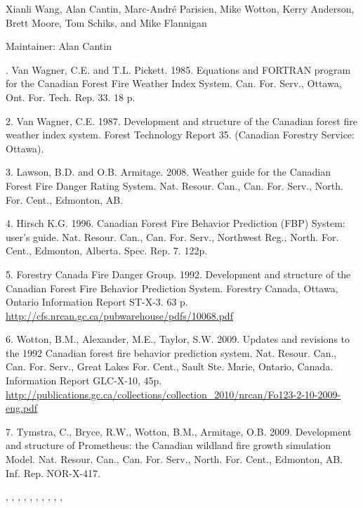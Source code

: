 \documentclass[a4paper]{book}
\begin{document}
%
\begin{Author}\relax
Xianli Wang, Alan Cantin, Marc-André Parisien, Mike Wotton, Kerry
Anderson, Brett Moore, Tom Schiks, and Mike Flannigan

Maintainer: Alan Cantin 
\end{Author}
%
\begin{References}. Van Wagner, C.E. and T.L. Pickett. 1985. Equations and
FORTRAN program for the Canadian Forest Fire Weather Index System. Can. For.
Serv., Ottawa, Ont. For. Tech. Rep. 33. 18 p.

2. Van Wagner, C.E. 1987. Development and structure of the Canadian forest
fire weather index system. Forest Technology Report 35. (Canadian Forestry
Service: Ottawa).

3. Lawson, B.D. and O.B. Armitage. 2008. Weather guide for the Canadian
Forest Fire Danger Rating System. Nat. Resour. Can., Can. For. Serv., North.
For. Cent., Edmonton, AB.

4. Hirsch K.G. 1996. Canadian Forest Fire Behavior Prediction (FBP) System:
user's guide. Nat. Resour. Can., Can. For. Serv., Northwest Reg., North.
For. Cent., Edmonton, Alberta. Spec. Rep. 7. 122p.

5. Forestry Canada Fire Danger Group. 1992. Development and structure of the
Canadian Forest Fire Behavior Prediction System. Forestry Canada, Ottawa,
Ontario Information Report ST-X-3. 63 p.
\url{http://cfs.nrcan.gc.ca/pubwarehouse/pdfs/10068.pdf}

6. Wotton, B.M., Alexander, M.E., Taylor, S.W. 2009. Updates and revisions
to the 1992 Canadian forest fire behavior prediction system. Nat. Resour.
Can., Can. For. Serv., Great Lakes For. Cent., Sault Ste. Marie, Ontario,
Canada. Information Report GLC-X-10, 45p.
\url{http://publications.gc.ca/collections/collection_2010/nrcan/Fo123-2-10-2009-eng.pdf}

7. Tymstra, C., Bryce, R.W., Wotton, B.M., Armitage, O.B. 2009. Development
and structure of Prometheus: the Canadian wildland fire growth simulation
Model. Nat. Resour. Can., Can. For. Serv., North. For. Cent., Edmonton, AB.
Inf. Rep. NOR-X-417.
\end{References}
%
\begin{SeeAlso}\relax
{}, , ,
, , ,
, , ,
, 
\end{SeeAlso}
\end{document}
